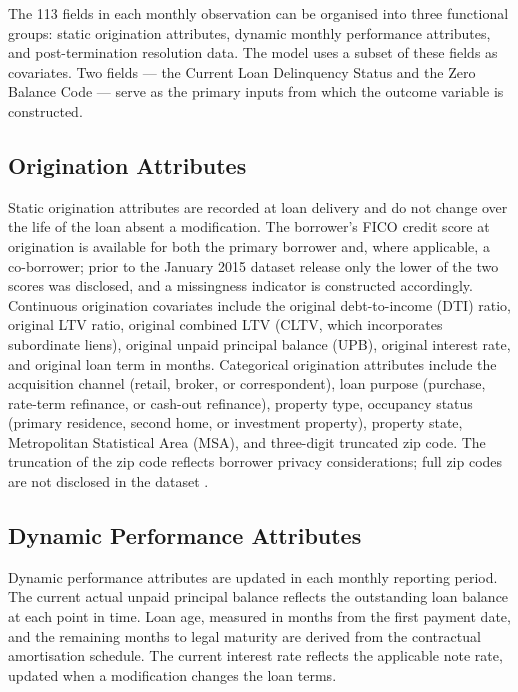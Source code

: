 The 113 fields in each monthly observation can be organised into three
functional groups: static origination attributes, dynamic monthly
performance attributes, and post-termination resolution data.  The
model uses a subset of these fields as covariates.  Two fields --- the
Current Loan Delinquency Status and the Zero Balance Code --- serve as
the primary inputs from which the outcome variable is constructed.

\subsection{Origination Attributes}
\label{subsec:data-origination}

Static origination attributes are recorded at loan delivery and do
not change over the life of the loan absent a modification.  The
borrower's FICO credit score at origination is available for both the
primary borrower and, where applicable, a co-borrower; prior to the
January 2015 dataset release only the lower of the two scores was
disclosed, and a missingness indicator is constructed accordingly.
Continuous origination covariates include the original
debt-to-income (DTI) ratio, original LTV ratio, original combined LTV
(CLTV, which incorporates subordinate liens), original unpaid
principal balance (UPB), original interest rate, and original loan
term in months.  Categorical origination attributes include the
acquisition channel (retail, broker, or correspondent), loan purpose
(purchase, rate-term refinance, or cash-out refinance), property type,
occupancy status (primary residence, second home, or investment
property), property state, Metropolitan Statistical Area (MSA), and
three-digit truncated zip code.  The truncation of the zip code
reflects borrower privacy considerations; full zip codes are not
disclosed in the dataset \citep{fanniemae2024}.

\subsection{Dynamic Performance Attributes}
\label{subsec:data-performance}

Dynamic performance attributes are updated in each monthly reporting
period.  The current actual unpaid principal balance reflects the
outstanding loan balance at each point in time.  Loan age, measured
in months from the first payment date, and the remaining months to
legal maturity are derived from the contractual amortisation schedule.
The current interest rate reflects the applicable note rate, updated
when a modification changes the loan terms.

